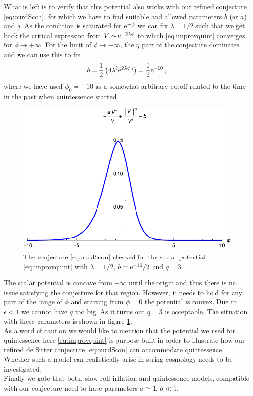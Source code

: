 \documentclass[12pt]{report}
\newcommand{\be}{\begin{equation}}
\newcommand{\ee}{\end{equation}}
\def\rme{{\rm e}}
\begin{document}
What is left is to verify that this potential also works with our refined conjecture \eqref{eq:ourdScon}, for which we have to find suitable and allowed parameters $b$ (or $a$) and $q$. As the condition is saturated for $\rme^ {-\phi}$ we can fix $\lambda = 1/2$ such that we get back the critical expression from $V \sim \rme^ {-2\lambda \phi}$ to which \eqref{eq:improvquint} converges for $\phi \to +\infty$. For the limit of $\phi \to - \infty$, the $\eta$ part of the conjecture dominates and we can use this to fix 
\be 
b = \frac{1}{2} \left( 4 \lambda^ 2 \rme^ {2\lambda \phi_0}\right) = \frac{1}{2} \rme^ {-10}\,,
\ee
where we have used $\phi_0=-10$ as a somewhat arbitrary cutoff related to the time in the past when quintessence started.
\begin{figure}[htb]
     \centering
     \includegraphics[scale=0.9]{quintpot2.pdf}
     \caption{The conjecture \eqref{eq:ourdScon} checked for the scalar potential \eqref{eq:improvquint} with $\lambda= 1/2$, $b=\rme^ {-10}/2$ and $q=3$.}
     \label{fig:quintpot2}
\end{figure}

The scalar potential is concave from $-\infty$ until the origin and thus there is no issue satisfying the conjecture for that region. However, it needs to hold for any part of the range of $\phi$ and starting from $\phi = 0$ the potential is convex. Due to $\epsilon < 1$ we cannot have $q$ too big. As it turns out $q=3$ is acceptable. The situation with these parameters is shown in figure \ref{fig:quintpot2}.\\
As a word of caution we would like to mention that the potential we used for quintessence here \eqref{eq:improvquint} is purpose built in order to illustrate how our refined de Sitter conjecture \eqref{eq:ourdScon} can accommodate quintessence. Whether such a model can realistically arise in string cosmology needs to be investigated.\\
Finally we note that both, slow-roll inflation and quintessence models, compatible with our conjecture need to have parameters $a \simeq 1$, $b\ll1$. 
\end{document}
